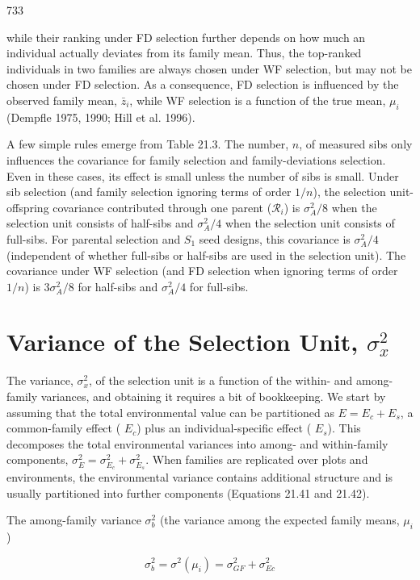 \documentclass{article}
\begin{document}
733

while their ranking under FD selection further depends on how much an individual actually deviates from its family mean. Thus, the top-ranked individuals in two families are always chosen under WF selection, but may not be chosen under FD selection. As a consequence, FD selection is influenced by the observed family mean,  $ \bar{z}_{i} $, while WF selection is a function of the true mean,  $ \mu_{i} $ (Dempfle 1975, 1990; Hill et al. 1996).

A few simple rules emerge from Table 21.3. The number, $n$, of measured sibs only influences the covariance for family selection and family-deviations selection. Even in these cases, its effect is small unless the number of sibs is small. Under sib selection (and family selection ignoring terms of order $1/n$), the selection unit-offspring covariance contributed through one parent ($\mathcal{R}_i$) is $\sigma_A^2/8$ when the selection unit consists of half-sibs and $\sigma_A^2/4$ when the selection unit consists of full-sibs. For parental selection and $S_1$ seed designs, this covariance is $\sigma_A^2/4$ (independent of whether full-sibs or half-sibs are used in the selection unit). The covariance under WF selection (and FD selection when ignoring terms of order $1/n$) is $3\sigma_A^2/8$ for half-sibs and $\sigma_A^2/4$ for full-sibs.

\section{Variance of the Selection Unit,  $ \sigma_{x}^{2} $}
The variance,  $ \sigma_{x}^{2} $, of the selection unit is a function of the within- and among-family variances, and obtaining it requires a bit of bookkeeping. We start by assuming that the total environmental value can be partitioned as  $ E = E_{c} + E_{s} $, a common-family effect ( $ E_{c} $) plus an individual-specific effect ( $ E_{s} $). This decomposes the total environmental variances into among- and within-family components,  $ \sigma_{E}^{2} = \sigma_{E_{c}}^{2} + \sigma_{E_{s}}^{2} $. When families are replicated over plots and environments, the environmental variance contains additional structure and is usually partitioned into further components (Equations 21.41 and 21.42).

The among-family variance  $ \sigma_{b}^{2} $ (the variance among the expected family means,  $ \mu_{i} $)

\begin{equation}
\sigma_{b}^{2}=\sigma^{2}(\mu_{i})=\sigma_{G F}^{2}+\sigma_{E c}^{2}
\tag{21.8a}
\label{eq:21_8a}
\end{equation}
\end{document}
